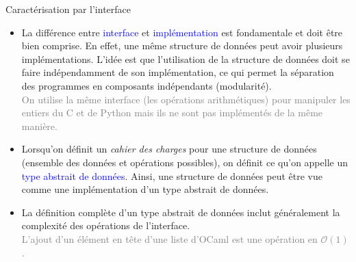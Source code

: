 \documentclass[10pt]{beamer}
\begin{document}
\begin{frame}{\Ctitle}{\stitle}
	\begin{alertblock}{Caractérisation par l'interface}
		\begin{itemize}
			\item<1-> La différence entre \textcolor{blue}{interface} et \textcolor{blue}{implémentation} est fondamentale et doit être bien comprise. En effet, une même structure de données peut avoir plusieurs implémentations. L'idée est que l'utilisation de la structure de données doit se faire indépendamment de son implémentation, ce qui permet la séparation des programmes en composants indépendants (modularité).\\
				\textcolor{gray}{On utilise la même interface (les opérations arithmétiques) pour manipuler les entiers du C et de Python mais ils ne sont pas implémentés de la même manière.}
			\item<2-> Lorsqu'on définit un \textit{cahier des charges} pour une structure de données (ensemble des données et opérations possibles), on définit ce qu'on appelle un \textcolor{blue}{type abstrait de données}. Ainsi, une structure de données peut être vue comme une implémentation d'un type abstrait de données.
			\item<3-> La définition complète d'un type abstrait de données inclut généralement la complexité des opérations de l'interface. \\
				\textcolor{gray}{L'ajout d'un élément en tête d'une liste d'OCaml est une opération en $\mathcal{O}(1)$.}
		\end{itemize}
	\end{alertblock}
\end{frame}
\end{document}
